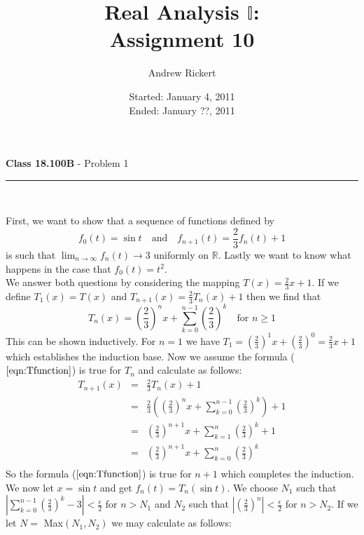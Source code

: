 \documentclass[11pt,reqno]{article}
\title{Real Analysis $\mathbb{I}$: \\ Assignment 10}
\author{Andrew Rickert}
\date{Started: January 4, 2011 \\ \hspace{1pt} Ended: January ??,  2011}                                           %
\begin{document}
\maketitle


\begin{flushleft} 
\textbf{Class 18.100B} - Problem 1\\
\rule{500pt}{1pt}\\
\end{flushleft} 

\noindent First, we want to show that a sequence of functions defined by 
\[ f_0(t) = \sin t \quad \text{and} \quad f_{n+1}(t) = \frac{2}{3}f_n(t) + 1\]
is such that $\lim_{n \to \infty} f_n(t) \to 3$ uniformly on $\mathbb{R}$. Lastly we want to know what happens in the case that $f_0(t) = t^2$.\\
\indent We answer both questions by considering the mapping $T(x) = \frac{2}{3}x + 1$. If we define $T_1(x) = T(x)$ and $T_{n+1}(x) = \frac{2}{3}T_n(x) + 1$ then we find that
\begin{equation}
T_n(x) = \left( \frac{2}{3} \right)^n x + \sum_{k=0}^{n-1} \left( \frac{2}{3} \right)^k \quad \text{for $n \ge 1$} \label{eqn:Tfunction}
\end{equation}
This can be shown inductively. For $n=1$ we have $T_1 =  \left( \frac{2}{3} \right)^1 x +  \left( \frac{2}{3} \right)^0 =  \frac{2}{3} x + 1$ which establishes the induction base. Now we assume the formula ($\ref{eqn:Tfunction}$) is true for $T_n$ and calculate as follows:
\begin{eqnarray*}
T_{n+1}(x) &=& \frac{2}{3}T_n(x) + 1 \\
		 &=& \frac{2}{3}\left( \left( \frac{2}{3} \right)^n x + \sum_{k=0}^{n-1} \left( \frac{2}{3} \right)^k \right) + 1 \\
		 &=& \left( \frac{2}{3} \right)^{n+1} x + \sum_{k=1}^{n} \left( \frac{2}{3} \right)^k + 1 \\
		 &=& \left( \frac{2}{3} \right)^{n+1} x + \sum_{k=0}^{n} \left( \frac{2}{3} \right)^k\\
\end{eqnarray*}
So the formula ($\ref{eqn:Tfunction}$) is true for $n+1$ which completes the induction.\\
We now let $x = \sin t$ and get $f_n(t) = T_n(\sin t)$. We choose $N_1$ such that $|\sum_{k=0}^{n-1} \left( \frac{2}{3} \right)^k - 3| < \frac{\epsilon}{2}$ for $n > N_1$ and $N_2$ such that $|\left( \frac{2}{3} \right)^n| < \frac{\epsilon}{2}$ for $n > N_2$. If we let $N = $ Max$(N_1, N_2)$ we may calculate as follows:
\end{document}
